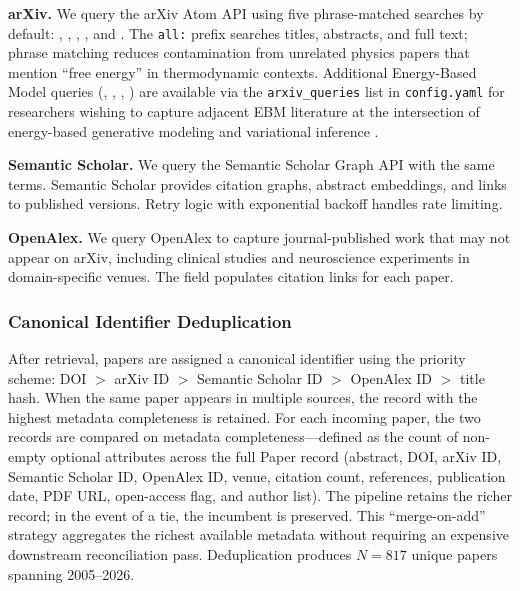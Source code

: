 \documentclass[
  english,
]{article}
\begin{document}
\textbf{arXiv.} We query the arXiv Atom API using five phrase-matched
searches by default: ,
,
,
, and
. The
\texttt{all:} prefix searches titles, abstracts, and full text; phrase
matching reduces contamination from unrelated physics papers that
mention ``free energy'' in thermodynamic contexts. Additional
Energy-Based Model queries
(,
,
,
)
are available via the \texttt{arxiv\_queries} list in
\texttt{config.yaml} for researchers wishing to capture adjacent EBM
literature at the intersection of energy-based generative modeling and
variational inference \citep{lecun2006tutorial}.

\textbf{Semantic Scholar.} We query the Semantic Scholar Graph API
\citep{kinney2023semantic} with the same terms. Semantic Scholar
provides citation graphs, abstract embeddings, and links to published
versions. Retry logic with exponential backoff handles rate limiting.

\textbf{OpenAlex.} We query OpenAlex \citep{priem2022openalex} to
capture journal-published work that may not appear on arXiv, including
clinical studies and neuroscience experiments in domain-specific venues.
The  field populates citation links for each
paper.

\subsubsection{Canonical Identifier
Deduplication}\label{canonical-identifier-deduplication}

After retrieval, papers are assigned a canonical identifier using the
priority scheme: DOI \(>\) arXiv ID \(>\) Semantic Scholar ID \(>\)
OpenAlex ID \(>\) title hash. When the same paper appears in multiple
sources, the record with the highest metadata completeness is retained.
For each incoming paper, the two records are compared on metadata
completeness---defined as the count of non-empty optional attributes
across the full Paper record (abstract, DOI, arXiv ID, Semantic Scholar
ID, OpenAlex ID, venue, citation count, references, publication date,
PDF URL, open-access flag, and author list). The pipeline retains the
richer record; in the event of a tie, the incumbent is preserved. This
``merge-on-add'' strategy aggregates the richest available metadata
without requiring an expensive downstream reconciliation pass.
Deduplication produces \(N = 817\) unique papers spanning 2005--2026.
\end{document}
